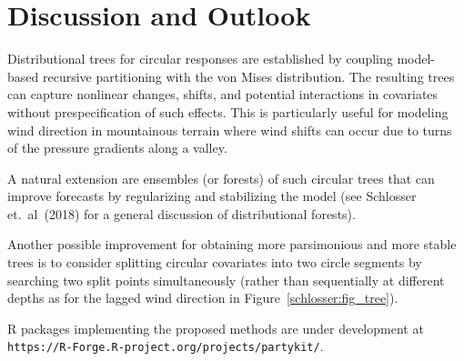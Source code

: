 \documentclass[twoside]{report}
\begin{document}
\section{Discussion and Outlook}

Distributional trees for circular responses are established by coupling
model-based recursive partitioning with the von Mises distribution.
The resulting trees can capture nonlinear changes, shifts, and potential interactions
in covariates without prespecification of such effects. This is particularly
useful for modeling wind direction in mountainous terrain where wind shifts
can occur due to turns of the pressure gradients along a valley.

A natural extension are ensembles (or forests) of such circular trees
that can improve forecasts by regularizing and stabilizing the model
(see Schlosser et.~al~(2018) for a general discussion of distributional forests). 

Another possible improvement for obtaining more parsimonious and more stable trees is to
consider splitting circular covariates into two circle segments by searching two
split points simultaneously (rather than sequentially at different depths as
for the lagged wind direction in Figure~\ref{schlosser:fig_tree}).

\textsf{R} packages implementing the proposed methods are under development at
\texttt{https://R-Forge.R-project.org/projects/partykit/}.


\bigskip
\end{document}
